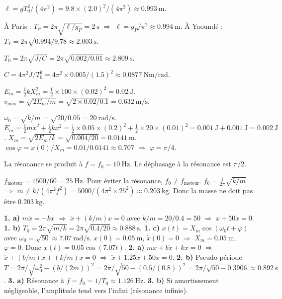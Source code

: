 $\ell = g T_0^2/(4\pi^2) = 9.8 \times (2.0)^2/(4\pi^2) \approx \SI{0.993}{\metre}$.

À Paris : $T_P = 2\pi\sqrt{\ell/g_P} = \SI{2}{\second}$ $\Rightarrow$ $\ell = g_P/\pi^2 \approx \SI{0.994}{\metre}$. À Yaoundé : $T_Y = 2\pi\sqrt{0.994/9.78} \approx \SI{2.003}{\second}$.

$T_0 = 2\pi\sqrt{J/C} = 2\pi\sqrt{0.002/0.01} \approx \SI{2.809}{\second}$.

$C = 4\pi^2 J / T_0^2 = 4\pi^2 \times 0.005 / (1.5)^2 \approx \SI{0.0877}{\newton\metre\per\radian}$.

$E_m = \frac{1}{2}k X_m^2 = \frac{1}{2} \times 100 \times (0.02)^2 = \SI{0.02}{\joule}$. $v_{\max} = \sqrt{2E_m/m} = \sqrt{2 \times 0.02 / 0.1} = \SI{0.632}{\metre\per\second}$.

$\omega_0 = \sqrt{k/m} = \sqrt{20/0.05} = \SI{20}{\radian\per\second}$. $E_m = \frac{1}{2}m\dot{x}^2 + \frac{1}{2}k x^2 = \frac{1}{2} \times 0.05 \times (0.2)^2 + \frac{1}{2} \times 20 \times (0.01)^2 = \SI{0.001}{\joule} + \SI{0.001}{\joule} = \SI{0.002}{\joule}$. $X_m = \sqrt{2E_m/k} = \sqrt{0.004/20} = \SI{0.0141}{\metre}$. $\cos\varphi = x(0)/X_m = 0.01/0.0141 \approx 0.707$ $\Rightarrow$ $\varphi = \pi/4$.

La résonance se produit à $f = f_0 = \SI{10}{\hertz}$. Le déphasage à la résonance est $\pi/2$.

$f_{\text{moteur}} = 1500/60 = \SI{25}{\hertz}$. Pour éviter la résonance, $f_0 \neq f_{\text{moteur}}$. $f_0 = \frac{1}{2\pi}\sqrt{k/m}$ $\Rightarrow$ $m \neq k/(4\pi^2 f^2) = 5000/(4\pi^2 \times 25^2) \approx \SI{0.203}{\kilogram}$. Donc la masse ne doit pas être $\SI{0.203}{\kilogram}$.

\textbf{1. a)} $m\ddot{x} = -kx$ $\Rightarrow$ $\ddot{x} + (k/m)x = 0$ avec $k/m = 20/0.4 = 50$ $\Rightarrow$ $\ddot{x} + 50x = 0$.
\textbf{1. b)} $T_0 = 2\pi\sqrt{m/k} = 2\pi\sqrt{0.4/20} \approx \SI{0.888}{\second}$.
\textbf{1. c)} $x(t) = X_m\cos(\omega_0 t + \varphi)$ avec $\omega_0 = \sqrt{50} \approx \SI{7.07}{\radian\per\second}$. $x(0) = \SI{0.05}{\metre}$, $\dot{x}(0) = 0$ $\Rightarrow$ $X_m = \SI{0.05}{\metre}$, $\varphi = 0$. Donc $x(t) = 0.05\cos(7.07 t)$.
\textbf{2. a)} $m\ddot{x} + b\dot{x} + kx = 0$ $\Rightarrow$ $\ddot{x} + (b/m)\dot{x} + (k/m)x = 0$ $\Rightarrow$ $\ddot{x} + 1.25\dot{x} + 50x = 0$.
\textbf{2. b)} Pseudo-période $T = 2\pi/\sqrt{\omega_0^2 - (b/(2m))^2} = 2\pi/\sqrt{50 - (0.5/(0.8))^2} = 2\pi/\sqrt{50 - 0.3906} \approx \SI{0.892}{\second}$.
\textbf{3. a)} Résonance à $f = f_0 = 1/T_0 \approx \SI{1.126}{\hertz}$.
\textbf{3. b)} Si amortissement négligeable, l'amplitude tend vers l'infini (résonance infinie).

